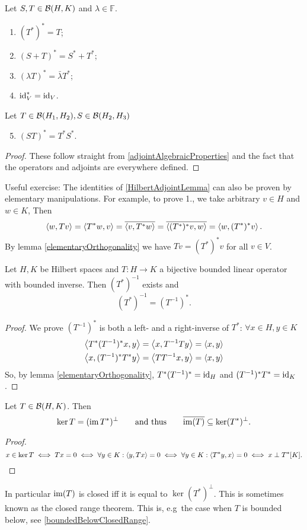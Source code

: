 \begin{lemma} \label{HilbertAdjointLemma}
Let $S,T\in\operatorname{\mathcal{B}}(H,K)$ and $\lambda \in \mathbb{F}$.
\begin{enumerate}
\item $(T^*)^* = T$;
\item $(S+T)^* = S^* + T^*$;
\item $(\lambda T)^* = \bar{\lambda}T^*$;
\item $\operatorname{id}_V^* = \operatorname{id}_V$.
\end{enumerate}
Let $T\in\operatorname{\mathcal{B}}(H_1,H_2), S\in\operatorname{\mathcal{B}}(H_2,H_3)$
\begin{enumerate}
\setcounter{enumi}{4}
\item $(ST)^* = T^*S^*$.
\end{enumerate}
\end{lemma}
\begin{proof}
These follow straight from \ref{adjointAlgebraicProperties} and the fact that the operators and adjoints are everywhere defined.
\end{proof}

\begin{note}
Useful exercise: The identities of \ref{HilbertAdjointLemma} can also be proven by elementary manipulations. For example, to prove 1., we take arbitrary $v\in H$ and $w\in K$, Then
\[ \left\langle w,Tv \right\rangle = \left\langle T^*w,v \right\rangle = \overline{\left\langle v,T^*w \right\rangle} = \overline{\left\langle (T^*)^*v,w \right\rangle} = \left\langle w, (T^*)^*v \right\rangle. \]
By lemma \ref{elementaryOrthogonality} we have $Tv = (T^*)^*v$ for all $v\in V$. 
\end{note}

\begin{proposition}
Let $H,K$ be Hilbert spaces and $T:H\to K$ a bijective bounded linear operator with bounded inverse. Then $(T^*)^{-1}$ exists and
\[ (T^*)^{-1} = (T^{-1})^*. \]
\end{proposition}
\begin{proof}
We prove $(T^{-1})^*$ is both a left- and a right-inverse of $T^*$: $\forall x\in H, y\in K$
\begin{align*}
\left\langle T^*(T^{-1})^*x,y \right\rangle &= \left\langle x,T^{-1}Ty \right\rangle = \left\langle x,y \right\rangle \\
\left\langle x,(T^{-1})^*T^*y \right\rangle &= \left\langle TT^{-1}x,y \right\rangle = \left\langle x,y \right\rangle
\end{align*}
So, by lemma \ref{elementaryOrthogonality}, $T^*(T^{-1})^* = \operatorname{id}_H$ and $(T^{-1})^*T^* = \operatorname{id}_K$.
\end{proof}

\begin{proposition}
Let $T\in\operatorname{\mathcal{B}}(H,K)$. Then
\[ \ker T = (\operatorname{im} T^*)^\perp \qquad \text{and thus} \qquad \overline{\operatorname{im}(T)} \subseteq \ker(T^*)^\perp. \]
\end{proposition}
\begin{proof}
\[ x\in \ker T \iff Tx = 0 \iff \forall y\in K: \left\langle y, Tx \right\rangle=0 \iff \forall y\in K: \left\langle T^*y, x \right\rangle=0 \iff x\perp T^*[K]. \]
\end{proof}
In particular $\operatorname{im}(T)$ is closed iff it is equal to $\ker(T^*)^\perp$. This is sometimes known as the closed range theorem. This is, e.g\, the case when $T$ is bounded below, see \ref{boundedBelowClosedRange}.


